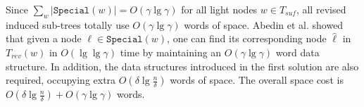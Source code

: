 \documentclass[smallabstract,smallcaptions]{dccpaper}
\def\idtt#1{\ensuremath{\mathtt{#1}}}
\def\SpecialLeaves{\idtt{SpecialLeaves}}
\def\SpecialSkylineList{\idtt{SpecialSkylineList}}
\def\Special{\idtt{Special}}
\def\lca{\idtt{lca}}
\begin{document}
Since $\sum_{w} |\Special(w)|=O(\gamma \lg \gamma)$ for all light nodes $w\in T_{suf}$, all revised induced sub-trees totally use $O(\gamma\lg \gamma)$ words of space.
Abedin et al. \cite[Lemma 19]{abedin2018heaviest} showed that given a node $\ell \in \Special(w)$, one can find its corresponding node $\hat{\ell}$ in $T_{rev}(w)$ in $O(\lg \lg \gamma)$ time by maintaining an $O(\gamma\lg \gamma)$ word data structure.
In addition, the data structures introduced in the first solution are also required, occupying extra $O(\delta \lg \frac{n}{\delta})$ words of space.
The overall space cost is $O(\delta \lg \frac{n}{\delta})+O(\gamma\lg \gamma)$ words.
\end{document}

